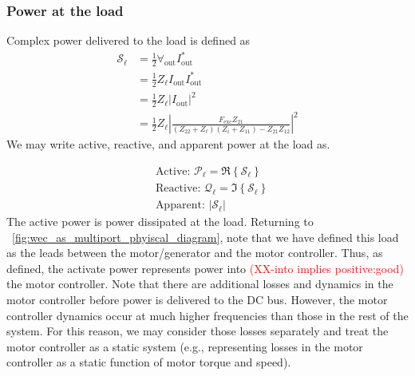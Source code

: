 \documentclass[lettersize,journal]{IEEEtran}
\newcommand{\rc}[1]{\textcolor{red}{#1}}
\begin{document}
\subsubsection{Power at the load}\label{sec:power_at_the_load}
Complex power delivered to the load is defined as 
\begin{equation}
\begin{aligned}
        \mathcal{S}_{\ell} 
        &= \frac{1}{2} \forall_{\textrm{out}} I_{\textrm{out}}^* \\
        &= \frac{1}{2} Z_\ell I_{\textrm{out}} I_{\textrm{out}}^* \\
        &= \frac{1}{2} Z_\ell | I_{\textrm{out}} |^2 \\
        &= \frac{1}{2} Z_\ell \left| \frac{F_{\textrm{exc}} Z_{21}}{ ( Z_{22} + Z_\ell ) (Z_i + Z_{11}) - Z_{21} Z_{12}  } \right|^2 
\end{aligned}
\end{equation}
\noindent{}We may write active, reactive, and apparent power at the load as.

\begin{subequations}
\begin{align}
&\textrm{Active: } \mathcal{P}_{\ell} = \Re \left\{ \mathcal{S}_{\ell} \right\} \\[0.5em]
&\textrm{Reactive: } \mathcal{Q}_{\ell} = \Im \left\{ \mathcal{S}_{\ell} \right\} \\[0.5em]
&\textrm{Apparent: } | \mathcal{S}_{\ell} |
\end{align}
\label{eq:load_power_types}
\end{subequations}
\noindent{}The active power is power dissipated at the load.
Returning to \figurename~\ref{fig:wec_as_multiport_phyiscal_diagram}, note that we have defined this load as the leads between the motor/generator and the motor controller.
Thus, as defined, the activate power represents power into \rc{(XX-into implies positive:good)} the motor controller.
Note that there are additional losses and dynamics in the motor controller before power is delivered to the DC bus.
However, the motor controller dynamics occur at much higher frequencies than those in the rest of the system.
For this reason, we may consider those losses separately and treat the motor controller as a static system (e.g., representing losses in the motor controller as a static function of motor torque and speed).

\end{document}
